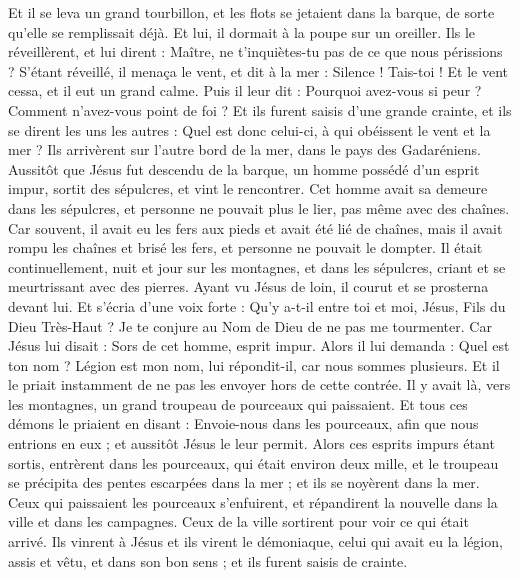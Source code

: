 \begin{multicols}{2}
Et il se leva un grand tourbillon, et les flots se jetaient dans la barque, de sorte qu'elle se remplissait déjà.
Et lui, il dormait à la poupe sur un oreiller. Ils le réveillèrent, et lui dirent : Maître, ne t’inquiètes-tu pas de ce que nous périssions ?
S’étant réveillé, il menaça le vent, et dit à la mer : Silence ! Tais-toi ! Et le vent cessa, et il eut un grand calme.
Puis il leur dit : Pourquoi avez-vous si peur ? Comment n'avez-vous point de foi ?
Et ils furent saisis d'une grande crainte, et ils se dirent les uns les autres : Quel est donc celui-ci, à qui obéissent le vent et la mer ?
\VerseOne{}Ils arrivèrent sur l’autre bord de la mer, dans le pays des Gadaréniens.
Aussitôt que Jésus fut descendu de la barque, un homme possédé d’un esprit impur, sortit des sépulcres, et vint le rencontrer.
Cet homme avait sa demeure dans les sépulcres, et personne ne pouvait plus le lier, pas même avec des chaînes.
Car souvent, il avait eu les fers aux pieds et avait été lié de chaînes, mais il avait rompu les chaînes et brisé les fers, et personne ne pouvait le dompter.
Il était continuellement, nuit et jour sur les montagnes, et dans les sépulcres, criant et se meurtrissant avec des pierres.
Ayant vu Jésus de loin, il courut et se prosterna devant lui.
Et s’écria d’une voix forte : Qu'y a-t-il entre toi et moi, Jésus, Fils du Dieu Très-Haut ? Je te conjure au Nom de Dieu de ne pas me tourmenter.
Car Jésus lui disait : Sors de cet homme, esprit impur.
Alors il lui demanda : Quel est ton nom ? Légion{} est mon nom, lui répondit-il, car nous sommes plusieurs.
Et il le priait instamment de ne pas les envoyer hors de cette contrée.
Il y avait là, vers les montagnes, un grand troupeau de pourceaux qui paissaient.
Et tous ces démons le priaient en disant : Envoie-nous dans les pourceaux, afin que nous entrions en eux ; et aussitôt Jésus le leur permit.
Alors ces esprits impurs étant sortis, entrèrent dans les pourceaux, qui était environ deux mille, et le troupeau se précipita des pentes escarpées dans la mer ; et ils se noyèrent dans la mer.
Ceux qui paissaient les pourceaux s'enfuirent, et répandirent la nouvelle dans la ville et dans les campagnes.
Ceux de la ville sortirent pour voir ce qui était arrivé. Ils vinrent à Jésus et ils virent le démoniaque, celui qui avait eu la légion, assis et vêtu, et dans son bon sens ; et ils furent saisis de crainte.

\end{multicols}
